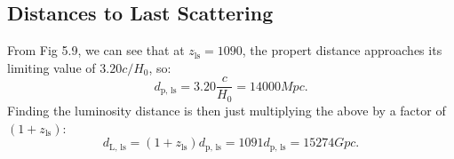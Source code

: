 \subsection{Distances to Last Scattering}
From Fig 5.9, we can see that at $z_{\text{ls}} = 1090$, the propert distance approaches its limiting value of $3.20c/H_0$, so:
\begin{equation}
    \boxed{d_{\text{p, ls}} = 3.20\frac{c}{H_0} = 14000\si{Mpc}}.
\end{equation}
Finding the luminosity distance is then just multiplying the above by a factor of $(1 + z_{\text{ls}})$:
\begin{equation}
    \boxed{d_{\text{L, ls}} = (1 + z_{\text{ls}})d_{\text{p, ls}} = 1091d_{\text{p, ls}} = 15274\si{Gpc}}.
\end{equation}